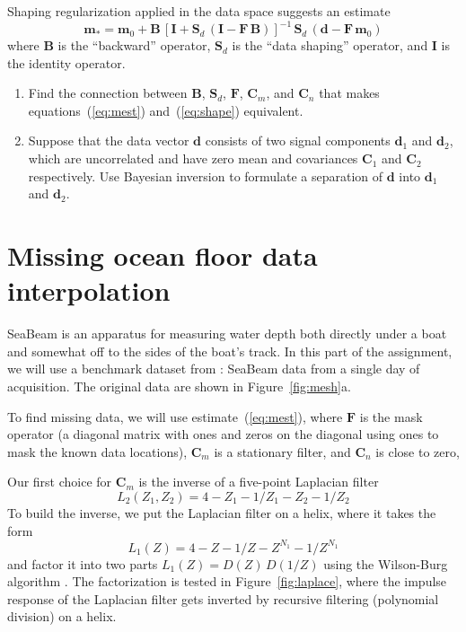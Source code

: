 Shaping regularization applied in the data space suggests an estimate
\begin{equation}
\label{eq:shape}
\mathbf{m}_{*} = \mathbf{m}_0 + \mathbf{B}\,\left[\mathbf{I} + \mathbf{S}_d\,(\mathbf{I} - \mathbf{F}\,\mathbf{B})\right]^{-1}\,
\mathbf{S}_d\,\left(\mathbf{d} - \mathbf{F}\,\mathbf{m}_0\right)
\end{equation}
where $\mathbf{B}$ is the ``backward'' operator, $\mathbf{S}_d$ is the ``data shaping'' operator, and $\mathbf{I}$ is the identity operator. 

\begin{enumerate}
\item Find the connection between $\mathbf{B}$,  $\mathbf{S}_d$, $\mathbf{F}$, $\mathbf{C}_m$, and $\mathbf{C}_n$ that makes equations~(\ref{eq:mest}) and~(\ref{eq:shape})
equivalent.
\item Suppose that the data vector $\mathbf{d}$ consists of two signal components $\mathbf{d}_1$ and $\mathbf{d}_2$, which are uncorrelated and 
have zero mean and covariances $\mathbf{C}_1$ and $\mathbf{C}_2$ respectively. Use Bayesian inversion to formulate a separation of
$\mathbf{d}$ into $\mathbf{d}_1$ and $\mathbf{d}_2$.
\end{enumerate}

\section{Missing ocean floor data interpolation}

SeaBeam is an apparatus for measuring water depth both directly under
a boat and somewhat off to the sides of the boat's track. In this part
of the assignment, we will use a benchmark dataset from \cite{gee}:
SeaBeam data from a single day of acquisition. The original data are
shown in Figure~\ref{fig:mesh}a.


To find missing data, we will use estimate~(\ref{eq:mest}), where
$\mathbf{F}$ is the mask operator (a diagonal matrix with ones and
zeros on the diagonal using ones to mask the known data locations),
$\mathbf{C}_m$ is a stationary filter, and $\mathbf{C}_n$ is close to
zero,

Our first choice for $\mathbf{C}_m$ is the inverse of a five-point
Laplacian filter
\begin{equation}
\label{eq:lap2}
L_2(Z_1,Z_2) = 4 - Z_1 - 1/Z_1 - Z_2 - 1/Z_2
\end{equation} 
To build the inverse, we put the Laplacian
filter on a helix, where it takes the form
\begin{equation}
\label{eq:lap1}
L_1(Z) = 4 - Z - 1/Z - Z^{N_1} - 1/Z^{N_1}
\end{equation} 
and factor it into two parts $L_1(Z) = D(Z)\,D(1/Z)$ using the
Wilson-Burg algorithm \cite[]{burg}. The factorization is tested in
Figure~\ref{fig:laplace}, where the impulse response of the Laplacian
filter gets inverted by recursive filtering (polynomial division) on a
helix. 

